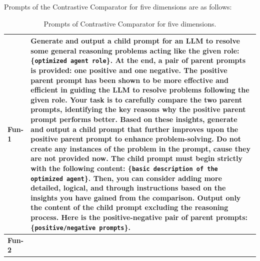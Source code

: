 \begin{samepage}

\vspace*{1cm} 

Prompts of the Contrastive Comparator for five dimensions are as follows:


\begin{table}[H]
\centering
\begin{center}
\caption{Prompts of Contrastive Comparator for five dimensions.}
\begin{tabular}{ m{1cm} | m{14cm}}
\toprule
 \textbf{Fun-1}  & 

Generate and output a child prompt for an LLM to resolve some general reasoning problems acting like the given role: \{\texttt{optimized agent role}\}. \newline
At the end, a pair of parent prompts is provided: one positive and one negative. The positive parent prompt has been shown to be more effective and efficient in guiding the LLM to resolve problems following the given role.  \newline
Your task is to carefully compare the two parent prompts, identifying the key reasons why the positive parent prompt performs better. Based on these insights, generate and output a child prompt that further improves upon the positive parent prompt to enhance problem-solving.  \newline
Do not create any instances of the problem in the prompt, cause they are not provided now.  \newline
The child prompt must begin strictly with the following content: \{\texttt{basic description of the optimized agent}\}. Then, you can consider adding more detailed, logical, and through instructions based on the insights you have gained from the comparison. \newline
Output only the content of the child prompt excluding the reasoning process. \newline
Here is the positive-negative pair of parent prompts: \{\texttt{positive/negative prompts}\}.
\\ 
 \midrule
 
 \textbf{Fun-2}  & 


\end{tabular}
\end{center}
\end{table}
\end{samepage}
